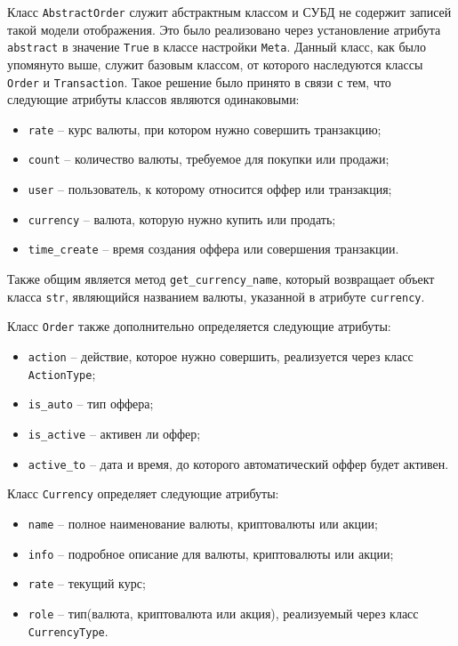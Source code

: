 Класс \lstinline{AbstractOrder} служит абстрактным классом и СУБД не содержит записей такой модели отображения.
Это было реализовано через установление атрибута \lstinline{abstract} в значение \lstinline{True} в классе настройки \lstinline{Meta}.
Данный класс, как было упомянуто выше, служит базовым классом, от которого наследуются классы \lstinline{Order} и \lstinline{Transaction}.
Такое решение было принято в связи с тем, что следующие атрибуты классов являются одинаковыми:
\begin{itemize}
    \item \lstinline{rate} -- курс валюты, при котором нужно совершить транзакцию;
    \item \lstinline{count} -- количество валюты, требуемое для покупки или продажи;
    \item \lstinline{user} -- пользователь, к которому относится оффер или транзакция;
    \item \lstinline{currency} -- валюта, которую нужно купить или продать;
    \item \lstinline{time_create} -- время создания оффера или совершения транзакции.
\end{itemize}
Также общим является метод \lstinline{get_currency_name}, который возвращает объект класса \lstinline{str}, являющийся названием валюты, указанной в атрибуте \lstinline{currency}.

Класс \lstinline{Order} также дополнительно определяется следующие атрибуты:
\begin{itemize}
    \item \lstinline{action} -- действие, которое нужно совершить, реализуется через класс \lstinline{ActionType};
    \item \lstinline{is_auto} -- тип оффера;
    \item \lstinline{is_active} -- активен ли оффер;
    \item \lstinline{active_to} -- дата и время, до которого автоматический оффер будет активен.
\end{itemize}

Класс \lstinline{Currency} определяет следующие атрибуты:
\begin{itemize}
    \item \lstinline{name} -- полное наименование валюты, криптовалюты или акции;
    \item \lstinline{info} -- подробное описание для валюты, криптовалюты или акции;
    \item \lstinline{rate} -- текущий курс;
    \item \lstinline{role} -- тип(валюта, криптовалюта или акция), реализуемый через класс \lstinline{CurrencyType}.
\end{itemize}


